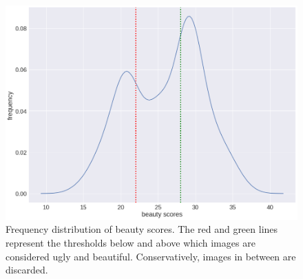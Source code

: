 
\begin{figure}[t!]
	\centering
	\includegraphics[width=0.7\columnwidth]{Plot/Trueskill.png}
	\caption{Frequency distribution of beauty scores. The red and green lines represent the thresholds below and above which images are considered ugly and beautiful. Conservatively, images in between are discarded.}
	\label{fig:Trueskill}
\end{figure}


